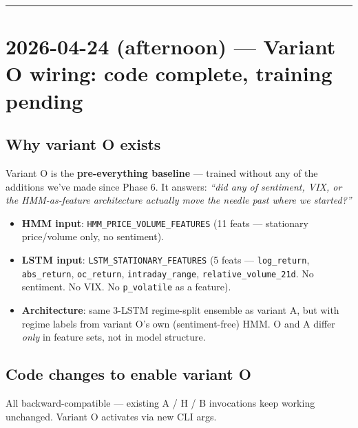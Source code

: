 \documentclass[11pt]{article}
\begin{document}
\vspace{1em}
\hrule
\vspace{1em}

\section*{2026-04-24 (afternoon) --- Variant O wiring: code complete, training pending}

\subsection*{Why variant O exists}

Variant O is the \textbf{pre-everything baseline} --- trained without any of the additions we've made since Phase 6. It answers: \emph{``did any of sentiment, VIX, or the HMM-as-feature architecture actually move the needle past where we started?''}

\begin{itemize}[leftmargin=*]
  \item \textbf{HMM input}: \texttt{HMM\_PRICE\_VOLUME\_FEATURES} (11 feats --- stationary price/volume only, no sentiment).
  \item \textbf{LSTM input}: \texttt{LSTM\_STATIONARY\_FEATURES} (5 feats --- \texttt{log\_return}, \texttt{abs\_return}, \texttt{oc\_return}, \texttt{intraday\_range}, \texttt{relative\_volume\_21d}. No sentiment. No VIX. No \texttt{p\_volatile} as a feature).
  \item \textbf{Architecture}: same 3-LSTM regime-split ensemble as variant A, but with regime labels from variant O's own (sentiment-free) HMM. O and A differ \emph{only} in feature sets, not in model structure.
\end{itemize}

\subsection*{Code changes to enable variant O}

All backward-compatible --- existing A / H / B invocations keep working unchanged. Variant O activates via new CLI args.
\end{document}
